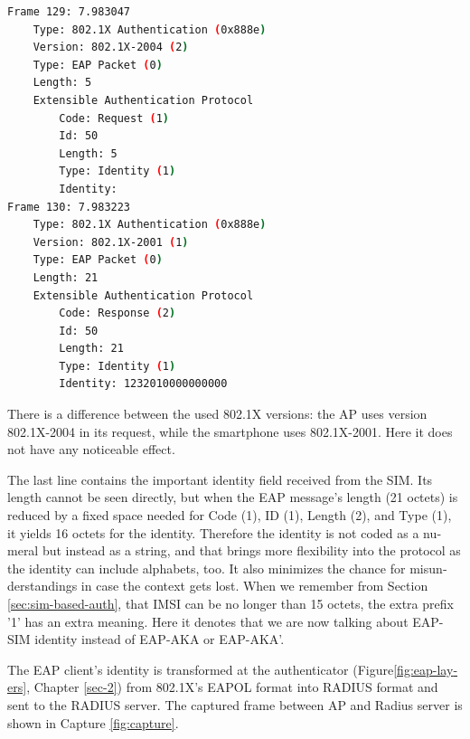 \documentclass[12pt,a4paper,english]{tutthesis}
\begin{document}
\begin{otherlanguage}{english}
\renewcommand{\lstlistingname}{Capture}

\begin{lstlisting}[language=bash,
  label=capimsi,
  caption={First detailed indication of IMSI, captured from WPA2-supplicant}
]
Frame 129: 7.983047
    Type: 802.1X Authentication (0x888e)
    Version: 802.1X-2004 (2)
    Type: EAP Packet (0)
    Length: 5
    Extensible Authentication Protocol
        Code: Request (1)
        Id: 50
        Length: 5
        Type: Identity (1)
        Identity: 
Frame 130: 7.983223
    Type: 802.1X Authentication (0x888e)
    Version: 802.1X-2001 (1)
    Type: EAP Packet (0)
    Length: 21
    Extensible Authentication Protocol
        Code: Response (2)
        Id: 50
        Length: 21
        Type: Identity (1)
        Identity: 1232010000000000
\end{lstlisting}
\normalsize

There is a difference between the used 802.1X versions: the AP uses version
802.1X-2004 in its request, while the smartphone uses 802.1X-2001. Here
it does not have any  noticeable effect.

The last line contains the important identity field received from the SIM.
Its length cannot  be seen directly, but when the EAP message's length (21
octets) is reduced by a fixed space needed for Code (1), ID (1),
Length (2), and Type (1), it yields 16 octets for the
identity. Therefore the identity is not coded as a 
numeral but instead as a string, and that brings more flexibility into
the protocol as the identity can include alphabets, too. It also
minimizes the chance for  misunderstandings in case the context gets lost. 
When we remember from Section \ref{sec:sim-based-auth}, that IMSI can be
no longer than 15 octets, the extra prefix '1' has an extra meaning.
Here it denotes that we are now talking  about EAP-SIM identity instead of
EAP-AKA or EAP-AKA'.





The EAP client's identity is transformed at the authenticator
(Figure\ref{fig:eap-layers}, Chapter \ref{sec-2}) from 802.1X's 
EAPOL format  into RADIUS format and
sent to the RADIUS server. The captured frame between AP and Radius server is
shown
in Capture \ref{fig:capture}.



\end{otherlanguage}
\end{document}
